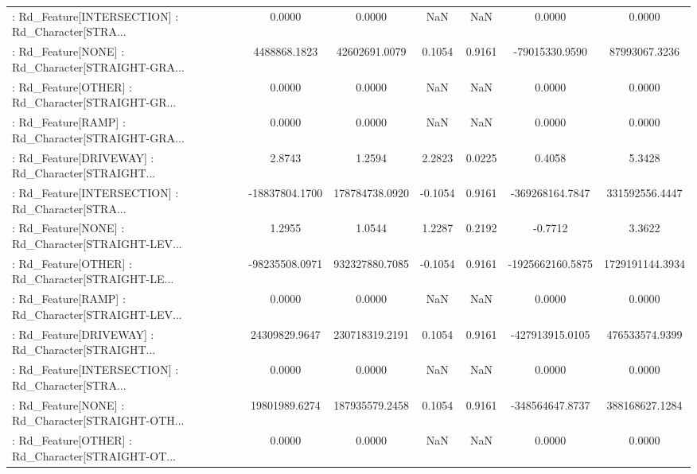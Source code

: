 \begin{longtable}{p{4cm}cccccc}
 : Rd\_Feature[INTERSECTION] : Rd\_Character[STRA... &            0.0000 &            0.0000 &     NaN &          NaN &             0.0000 &            0.0000 \\
 : Rd\_Feature[NONE] : Rd\_Character[STRAIGHT-GRA... &      4488868.1823 &     42602691.0079 &  0.1054 &       0.9161 &     -79015330.9590 &     87993067.3236 \\
 : Rd\_Feature[OTHER] : Rd\_Character[STRAIGHT-GR... &            0.0000 &            0.0000 &     NaN &          NaN &             0.0000 &            0.0000 \\
 : Rd\_Feature[RAMP] : Rd\_Character[STRAIGHT-GRA... &            0.0000 &            0.0000 &     NaN &          NaN &             0.0000 &            0.0000 \\
 : Rd\_Feature[DRIVEWAY] : Rd\_Character[STRAIGHT... &            2.8743 &            1.2594 &  2.2823 &       0.0225 &             0.4058 &            5.3428 \\
 : Rd\_Feature[INTERSECTION] : Rd\_Character[STRA... &    -18837804.1700 &    178784738.0920 & -0.1054 &       0.9161 &    -369268164.7847 &    331592556.4447 \\
 : Rd\_Feature[NONE] : Rd\_Character[STRAIGHT-LEV... &            1.2955 &            1.0544 &  1.2287 &       0.2192 &            -0.7712 &            3.3622 \\
 : Rd\_Feature[OTHER] : Rd\_Character[STRAIGHT-LE... &    -98235508.0971 &    932327880.7085 & -0.1054 &       0.9161 &   -1925662160.5875 &   1729191144.3934 \\
 : Rd\_Feature[RAMP] : Rd\_Character[STRAIGHT-LEV... &            0.0000 &            0.0000 &     NaN &          NaN &             0.0000 &            0.0000 \\
 : Rd\_Feature[DRIVEWAY] : Rd\_Character[STRAIGHT... &     24309829.9647 &    230718319.2191 &  0.1054 &       0.9161 &    -427913915.0105 &    476533574.9399 \\
 : Rd\_Feature[INTERSECTION] : Rd\_Character[STRA... &            0.0000 &            0.0000 &     NaN &          NaN &             0.0000 &            0.0000 \\
 : Rd\_Feature[NONE] : Rd\_Character[STRAIGHT-OTH... &     19801989.6274 &    187935579.2458 &  0.1054 &       0.9161 &    -348564647.8737 &    388168627.1284 \\
 : Rd\_Feature[OTHER] : Rd\_Character[STRAIGHT-OT... &            0.0000 &            0.0000 &     NaN &          NaN &             0.0000 &            0.0000 \\

\end{longtable}
